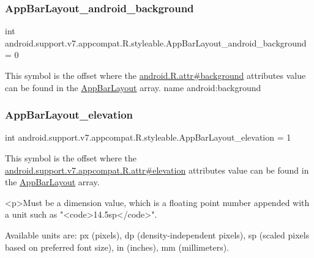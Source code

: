 \subsubsection{\texorpdfstring{App\+Bar\+Layout\+\_\+android\+\_\+background}{AppBarLayout\_android\_background}}
{\footnotesize\ttfamily int android.\+support.\+v7.\+appcompat.\+R.\+styleable.\+App\+Bar\+Layout\+\_\+android\+\_\+background = 0\hspace{0.3cm}{\ttfamily [static]}}

This symbol is the offset where the \hyperlink{}{android.\+R.\+attr\#background} attribute\textquotesingle{}s value can be found in the \hyperlink{classandroid_1_1support_1_1v7_1_1appcompat_1_1R_1_1styleable_a4a6b654a45dba60e2dbee9ce169563e2}{App\+Bar\+Layout} array.  name android\+:background \mbox{\label{classandroid_1_1support_1_1v7_1_1appcompat_1_1R_1_1styleable_a49faefcaa55b3757d218b00d5575a9ef}} 
\subsubsection{\texorpdfstring{App\+Bar\+Layout\+\_\+elevation}{AppBarLayout\_elevation}}
{\footnotesize\ttfamily int android.\+support.\+v7.\+appcompat.\+R.\+styleable.\+App\+Bar\+Layout\+\_\+elevation = 1\hspace{0.3cm}{\ttfamily [static]}}

This symbol is the offset where the \hyperlink{classandroid_1_1support_1_1v7_1_1appcompat_1_1R_1_1attr_a4ad8a7d23ae4731f5836683e9cb7f790}{android.\+support.\+v7.\+appcompat.\+R.\+attr\#elevation} attribute\textquotesingle{}s value can be found in the \hyperlink{classandroid_1_1support_1_1v7_1_1appcompat_1_1R_1_1styleable_a4a6b654a45dba60e2dbee9ce169563e2}{App\+Bar\+Layout} array.

\begin{DoxyVerb}      <p>Must be a dimension value, which is a floating point number appended with a unit such as "<code>14.5sp</code>".
\end{DoxyVerb}
 Available units are\+: px (pixels), dp (density-\/independent pixels), sp (scaled pixels based on preferred font size), in (inches), mm (millimeters). 

